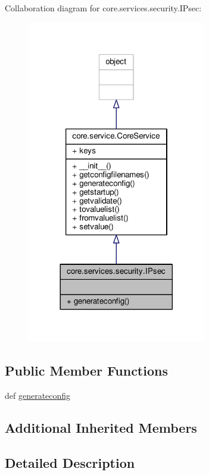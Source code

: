Collaboration diagram for core.\+services.\+security.\+I\+Psec\+:
\nopagebreak
\begin{figure}[H]
\begin{center}
\leavevmode
\includegraphics[width=221pt]{classcore_1_1services_1_1security_1_1_i_psec__coll__graph}
\end{center}
\end{figure}
\subsection*{Public Member Functions}
\begin{DoxyCompactItemize}
\item 
def \hyperlink{classcore_1_1services_1_1security_1_1_i_psec_a50542fd50cd2d5569e9a9a79f15ecbfa}{generateconfig}
\end{DoxyCompactItemize}
\subsection*{Additional Inherited Members}


\subsection{Detailed Description}
\begin{DoxyVerb}\end{DoxyVerb}
 

